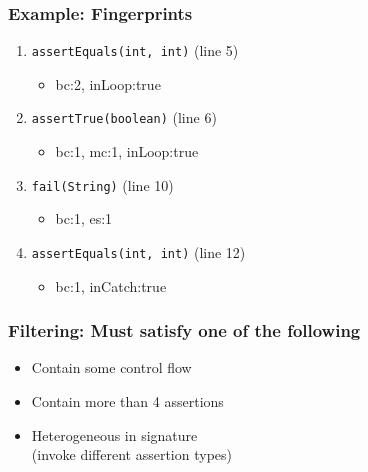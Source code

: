 \documentclass{beamer}
\begin{document}
\begin{frame}
  \frametitle{Example: Fingerprints} {\Large	
     \begin{enumerate}
        \item {\tt assertEquals(int, int)} (line 5)
           \begin{itemize}
              \item bc:2, inLoop:true
           \end{itemize}
           \vspace{0.5cm}
        \item {\tt assertTrue(boolean)} (line 6)
           \begin{itemize}
              \item bc:1, mc:1, inLoop:true
           \end{itemize}
           \vspace{0.5cm}
        \item {\tt fail(String)} (line 10)
           \begin{itemize}
              \item bc:1, es:1
           \end{itemize}
           \vspace{0.5cm}
        \item {\tt assertEquals(int, int)} (line 12)
           \begin{itemize}
              \item bc:1, inCatch:true
           \end{itemize}
     \end{enumerate}
	}
\end{frame}

\begin{frame}
\frametitle{Filtering: Must satisfy one of the following} {
   \Large
   \begin{itemize}
      \item Contain some control flow
         \vspace{0.5cm}
      \item Contain more than 4 assertions
         \vspace{0.5cm}
      \item Heterogeneous in signature \\(invoke different assertion types)
   \end{itemize}
   }
\end{frame}
\end{document}
